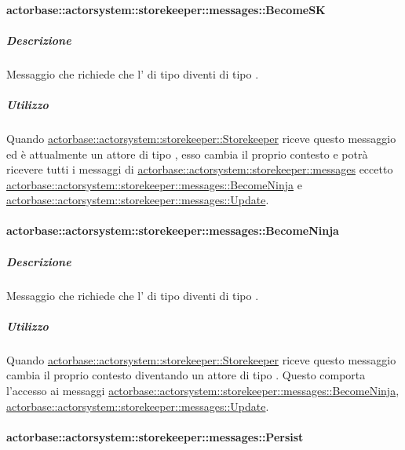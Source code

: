 \documentclass{scalatekids-article}
\begin{document}
\paragraph{actorbase::actorsystem::storekeeper::messages::BecomeSK}
\label{sec:actorbase::actorsystem::storekeeper::messages::BecomeSK}

\subparagraph{Descrizione}

Messaggio che richiede che l' di tipo  diventi di tipo
.

\subparagraph{Utilizzo}
Quando \hyperref[sec:actorbase::actorsystem::storekeeper::Storekeeper]{actorbase::actorsystem::storekeeper::Storekeeper}
riceve questo messaggio ed è attualmente un attore di tipo ,
esso cambia il proprio contesto e potrà ricevere tutti i messaggi
di \hyperref[sec:actorbase::actorsystem::storekeeper::messages]{actorbase::\allowbreak{}actorsystem::\allowbreak{}storekeeper::\allowbreak{}messages}
eccetto \hyperref[sec:actorbase::actorsystem::storekeeper::messages::BecomeNinja]{actorbase::\allowbreak{}actorsystem::\allowbreak{}storekeeper::\allowbreak{}messages::\allowbreak{}BecomeNinja} e
\hyperref[sec:actorbase::actorsystem::storekeeper::messages::Update]{actorbase::\allowbreak{}actorsystem::\allowbreak{}storekeeper::\allowbreak{}messages::\allowbreak{}Update}.

\paragraph{actorbase::actorsystem::storekeeper::messages::BecomeNinja}
\label{sec:actorbase::actorsystem::storekeeper::messages::BecomeNinja}

\subparagraph{Descrizione}
Messaggio che richiede che l' di tipo  diventi di tipo
.

\subparagraph{Utilizzo}
Quando \hyperref[sec:actorbase::actorsystem::storekeeper::Storekeeper]{actorbase::actorsystem::storekeeper::Storekeeper}
riceve questo messaggio cambia il proprio contesto diventando un attore di tipo . Questo comporta l'accesso ai messaggi
\hyperref[sec:actorbase::actorsystem::storekeeper::messages::BecomeNinja]{actorbase::\allowbreak{}actorsystem::\allowbreak{}storekeeper::\allowbreak{}messages::\allowbreak{}BecomeNinja},
\hyperref[sec:actorbase::actorsystem::storekeeper::messages::Update]{actorbase::\allowbreak{}actorsystem::\allowbreak{}storekeeper::\allowbreak{}messages::\allowbreak{}Update}.

\paragraph{actorbase::actorsystem::storekeeper::messages::Persist}
\label{sec:actorbase::actorsystem::storekeeper::messages::Persist}
\end{document}
